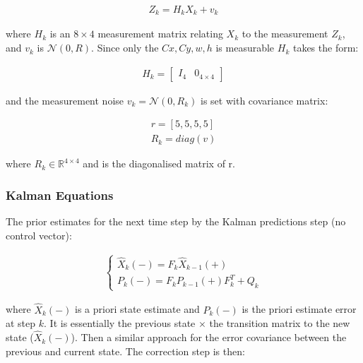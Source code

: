 \documentclass[a4paper,11pt,notitlepage]{article}
\begin{document}
\begin{equation}
\begin{aligned}
Z_{k} =  H_{k} X_{k} + v_{k}
\end{aligned}
\end{equation}

where $H_{k}$ is an $8 \times 4$ measurement matrix relating $X_{k}$ to the measurement $Z_{k}$, and $v_{k}$ is $\mathcal{N}(0,R)$. Since only the $Cx,Cy,w,h$ is measurable $H_{k}$ takes the form:



\begin{equation}
\begin{aligned}
H_{k} = 
\begin{bmatrix}
I_{4} &  0_{4 \times 4}
\end{bmatrix}
\end{aligned}
\end{equation}

and the measurement noise $v_{k} = \mathcal{N}(0,R_{k})$ is set with covariance matrix:

\begin{equation}
\begin{aligned}
r = [5,5,5,5] \\
R_{k} = diag(v)
\end{aligned}
\end{equation}

where $R_{k} \in \mathbb{R}^{4 \times 4}$ and is the diagonalised matrix of r. 

\subsubsection{Kalman Equations}
The prior estimates for the next time step by the Kalman predictions step (no control vector):

\begin{equation}
\label{Kalman_pred_eq}
\begin{aligned}
\begin{cases}
\hat{X}_{k}(-) =  F_{k} \hat{X}_{k-1}(+)\\
P_{k}(-) = F_{k} P_{k-1}(+) F_{k}^{T} + Q_{k}
\end{cases}
\end{aligned}
\end{equation}

where $\hat{X}_{k}(-)$ is a priori state estimate and $P_{k}(-)$ is the priori estimate error at step $k$. It is essentially the previous state $\times$ the transition matrix to the new state ($\hat{X}_{k}(-)$). Then a similar approach for the error covariance between the previous and current state. The correction step is then:
\end{document}
